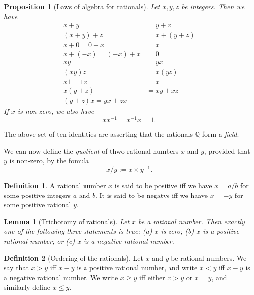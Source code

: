\documentclass[
]{book}
\newtheorem{lemma}{Lemma}[chapter]
\newtheorem{proposition}{Proposition}[chapter]
\theoremstyle{definition}
\newtheorem{definition}{Definition}[chapter]
\theoremstyle{definition}
\theoremstyle{definition}
\theoremstyle{definition}
\theoremstyle{remark}
\begin{document}
\begin{proposition}[Laws of algebra for rationals]
Let \(x,y,z\) be integers. Then we have
\[
\begin{aligned}
  x+y&=y+x\\
  (x+y)+z&=x+(y+z)\\
  x+0=0+x&=x\\
  x+(-x) = (-x)+x&=0\\
  xy&=yx\\
  (xy)z&=x(yz)\\
  x1=1x&=x\\
  x(y+z)&=xy+xz\\
  (y+z)x=yx+zx
\end{aligned}
\]
If \(x\) is non-zero, we also have
\[xx^{-1} = x^{-1}x=1.\]
\end{proposition}

The above set of ten identities are asserting that the rationals \(\mathbb{Q}\) form a \emph{field}.

We can now define the \emph{quotient} of thwo rational numbers \(x\) and \(y\), provided that \(y\) is non-zero, by the fomula
\[
x/y:=x\times y^{-1}.
\]

\begin{definition}
A rational number \(x\) is said to be positive iff we have \(x=a/b\) for some positive integers \(a\) and \(b\). It is said to be negatve iff we haave \(x=-y\) for some positive rational \(y\).
\end{definition}

\begin{lemma}[Trichotomy of rationals]
Let \(x\) be a rational number. Then exactly one of the following three statements is true: (a) \(x\) is zero; (b) \(x\) is a positive rational number; or (c) \(x\) is a negative rational number.
\end{lemma}

\begin{definition}[Ordering of the rationals]
Let \(x\) and \(y\) be rational numbers. We say that \(x>y\) iff \(x-y\) is a positive rational number, and write \(x<y\) iff \(x-y\) is a negative rational number. We write \(x\geq y\) iff either \(x>y\) or \(x=y\), and similarly define \(x\leq y\).
\end{definition}
\end{document}
